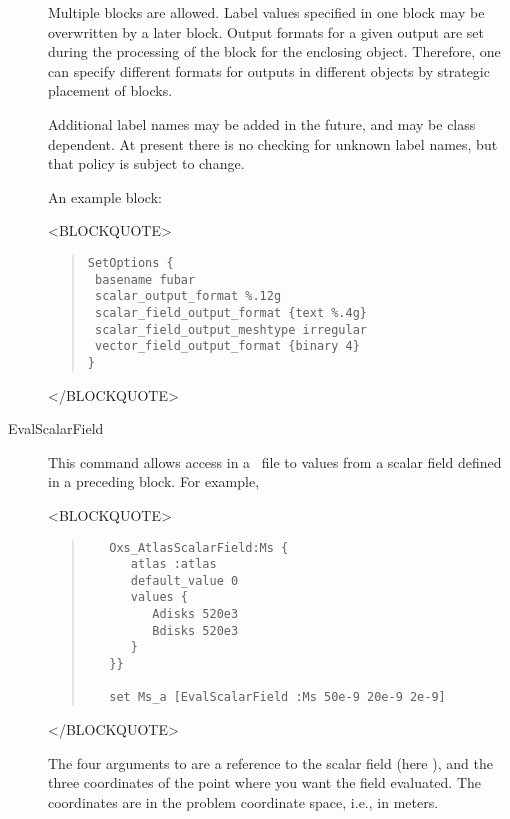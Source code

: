 \begin{description}
Multiple  blocks are allowed.  Label values specified
in one  block may be overwritten by a later
 block.  Output formats for a given output are
set during the processing of the  block for the enclosing
 object.  Therefore, one can specify different formats
for outputs in different  objects by strategic placement
of  blocks.

Additional label names may be added in the future, and may be
 class dependent.  At present there is no checking for
unknown label names, but that policy is subject to change.

An example  block:
\begin{rawhtml}
<BLOCKQUOTE>
\end{rawhtml}
\begin{quote}
\begin{verbatim}
SetOptions {
 basename fubar
 scalar_output_format %.12g
 scalar_field_output_format {text %.4g}
 scalar_field_output_meshtype irregular
 vector_field_output_format {binary 4}
}
\end{verbatim}
\end{quote}
\begin{rawhtml}
</BLOCKQUOTE>
\end{rawhtml}


\item[EvalScalarField\label{html:mif2EvalScalarField}]
This command allows access in a \MIF\ file to values from a scalar field
defined in a preceding  block.  For example,
\begin{rawhtml}
<BLOCKQUOTE>
\end{rawhtml}
\begin{quote}
\begin{verbatim}
   Oxs_AtlasScalarField:Ms {
      atlas :atlas
      default_value 0
      values {
         Adisks 520e3
         Bdisks 520e3
      }
   }}

   set Ms_a [EvalScalarField :Ms 50e-9 20e-9 2e-9]
\end{verbatim}
\end{quote}
\begin{rawhtml}
</BLOCKQUOTE>
\end{rawhtml}
The four arguments to  are a reference to the scalar
field (here ), and the three coordinates of the point where you
want the field evaluated.  The coordinates are in the problem coordinate
space, i.e., in meters.


\end{description}
